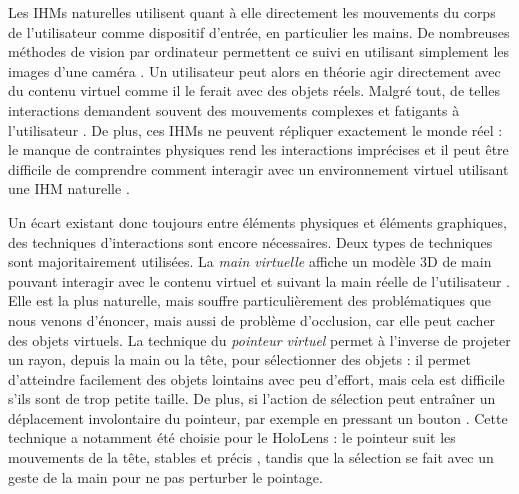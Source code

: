 
Les IHMs naturelles utilisent quant à elle directement les mouvements du corps de l'utilisateur comme dispositif d'entrée, en particulier les mains. De nombreuses méthodes de vision par ordinateur permettent ce suivi en utilisant simplement les images d'une caméra \citep{Billinghurst2015}. Un utilisateur peut alors en théorie agir directement avec du contenu virtuel comme il le ferait avec des objets réels. Malgré tout, de telles interactions demandent souvent des mouvements complexes et fatigants à l'utilisateur \citep{Bowman2001}. De plus, ces IHMs ne peuvent répliquer exactement le monde réel : le manque de contraintes physiques rend les interactions imprécises \citep{Chan2010} et il peut être difficile de comprendre comment interagir avec un environnement virtuel utilisant une IHM naturelle \citep{Argelaguet2013}.


Un écart existant donc toujours entre éléments physiques et éléments graphiques, des techniques d'interactions sont encore nécessaires. Deux types de techniques sont majoritairement utilisées. La \emph{main virtuelle} affiche un modèle 3D de main pouvant interagir avec le contenu virtuel et suivant la main réelle de l'utilisateur . Elle est la plus naturelle, mais souffre particulièrement des problématiques que nous venons d'énoncer, mais aussi de problème d'occlusion, car elle peut cacher des objets virtuels. La technique du \emph{pointeur virtuel} permet à l'inverse de projeter un rayon, depuis la main ou la tête, pour sélectionner des objets  : il permet d'atteindre facilement des objets lointains avec peu d'effort, mais cela est difficile s'ils sont de trop petite taille. De plus, si l'action de sélection peut entraîner un déplacement involontaire du pointeur, par exemple en pressant un bouton \citep{Argelaguet2013}. Cette technique a notamment été choisie pour le HoloLens : le pointeur suit les mouvements de la tête, stables et précis \citep{Kytoe2018}, tandis que la sélection se fait avec un geste de la main pour ne pas perturber le pointage.

